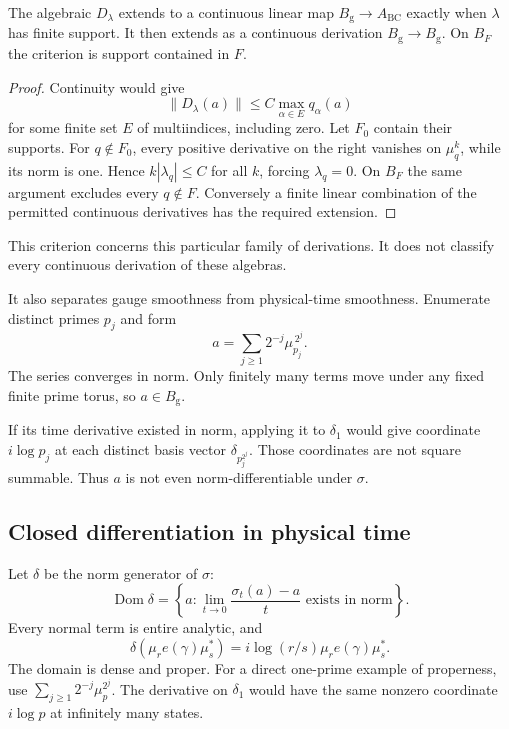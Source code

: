 \begin{proposition}
\label{v4-arith:traces:gauge-continuity}
The algebraic $D_\lambda$ extends to a continuous linear map $B_{\mathrm
g}\to A_{\mathrm{BC}}$ exactly when $\lambda$ has finite support. It then
extends as a continuous derivation $B_{\mathrm g}\to B_{\mathrm g}$. On
$B_F$ the criterion is support contained in $F$.
\end{proposition}
\begin{proof}
Continuity would give
\[
 \|D_\lambda(a)\|
   \leq C\max_{\alpha\in E}q_\alpha(a)
\]
for some finite set $E$ of multiindices, including zero. Let $F_0$ contain
their supports. For $q\notin F_0$, every positive derivative on the right
vanishes on $\mu_q^k$, while its norm is one. Hence $k|\lambda_q|\leq C$ for
all $k$, forcing $\lambda_q=0$. On $B_F$ the same argument excludes every
$q\notin F$. Conversely a finite linear combination of the permitted
continuous derivatives has the required extension.
\end{proof}

This criterion concerns this particular family of derivations. It does not
classify every continuous derivation of these algebras.

It also separates gauge smoothness from physical-time smoothness. Enumerate
distinct primes $p_j$ and form
\[
 a=\sum_{j\geq1}2^{-j}\mu_{p_j}^{\,2^j}.
\]
The series converges in norm. Only finitely many terms move under any fixed
finite prime torus, so $a\in B_{\mathrm g}$.

If its time derivative existed in norm, applying it to $\delta_1$ would give
coordinate $i\log p_j$ at each distinct basis vector $\delta_{p_j^{2^j}}$.
Those coordinates are not square summable. Thus $a$ is not even
norm-differentiable under $\sigma$.

\subsection{Closed differentiation in physical time}

Let $\delta$ be the norm generator of $\sigma$:
\[
 \operatorname{Dom}\delta
  =\left\{a:\lim_{t\to0}\frac{\sigma_t(a)-a}{t}
                         \text{ exists in norm}\right\}.
\]
Every normal term is entire analytic, and
\[
 \delta(\mu_re(\gamma)\mu_s^*)
   =i\log(r/s)\mu_re(\gamma)\mu_s^*.
\]
The domain is dense and proper. For a direct one-prime example of
properness, use $\sum_{j\geq1}2^{-j}\mu_p^{2^j}$. The derivative on
$\delta_1$ would have the same nonzero coordinate $i\log p$ at infinitely
many states.

